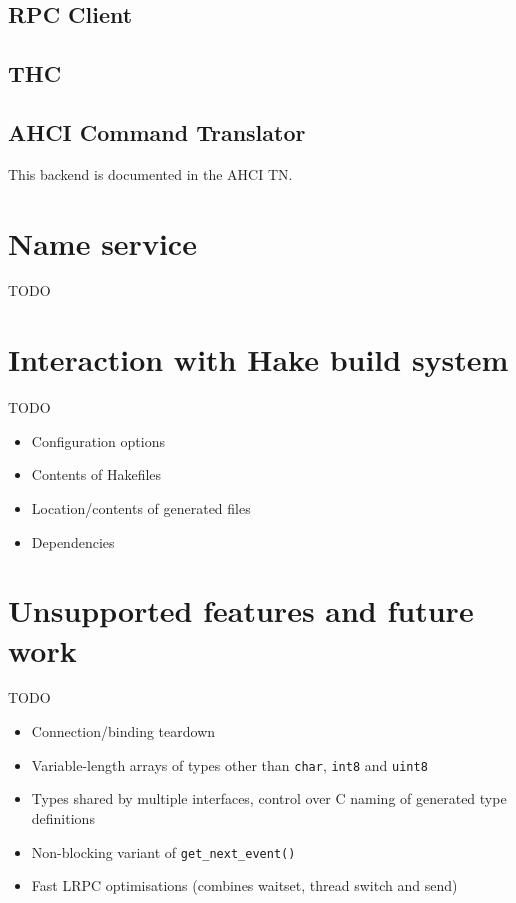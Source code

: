 \documentclass[a4paper,twoside]{report} %
\begin{document}
\section{RPC Client}
\label{sec:rpcclient}

\section{THC}
\label{sec:thc}

\section{AHCI Command Translator}
\label{sec:ahci}

This backend is documented in the AHCI TN.

\chapter{Name service}
\label{cha:nameservice}

TODO


\chapter{Interaction with Hake build system}
\label{cha:hake}

TODO

\begin{itemize}
 \item Configuration options
 \item Contents of Hakefiles
 \item Location/contents of generated files
 \item Dependencies
\end{itemize}


\chapter{Unsupported features and future work}

TODO

\begin{itemize}
 \item Connection/binding teardown
 \item Variable-length arrays of types other than \lstinline+char+,
        \lstinline+int8+ and \lstinline+uint8+
 \item Types shared by multiple interfaces, control over C naming of generated
        type definitions
 \item Non-blocking variant of \lstinline+get_next_event()+
 \item Fast LRPC optimisations (combines waitset, thread switch and send)
\end{itemize}

 

\end{document}
